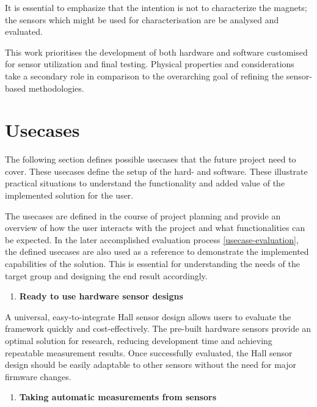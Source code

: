 It is essential to emphasize that the intention is not to characterize
the magnets; the sensors which might be used for characterisation are be
analysed and evaluated.

This work prioritises the development of both hardware and software
customised for sensor utilization and final testing. Physical properties
and considerations take a secondary role in comparison to the
overarching goal of refining the sensor-based methodologies.

\hypertarget{usecases}{%
\section{Usecases}\label{usecases}}

The following section defines possible usecases that the future project
need to cover. These usecases define the setup of the hard- and
software. These illustrate practical situations to understand the
functionality and added value of the implemented solution for the user.

The usecases are defined in the course of project planning and provide
an overview of how the user interacts with the project and what
functionalities can be expected. In the later accomplished evaluation
process \ref{usecase-evaluation}, the defined usecases are also used as
a reference to demonstrate the implemented capabilities of the solution.
This is essential for understanding the needs of the target group and
designing the end result accordingly.

\begin{enumerate}
\def\labelenumi{\arabic{enumi}.}
\tightlist
\item
  \textbf{Ready to use hardware sensor designs}
\end{enumerate}

A universal, easy-to-integrate Hall sensor design allows users to
evaluate the framework quickly and cost-effectively. The pre-built
hardware sensors provide an optimal solution for research, reducing
development time and achieving repeatable measurement results. Once
successfully evaluated, the Hall sensor design should be easily
adaptable to other sensors without the need for major firmware changes.

\begin{enumerate}
\def\labelenumi{\arabic{enumi}.}
\setcounter{enumi}{1}
\tightlist
\item
  \textbf{Taking automatic measurements from sensors}
\end{enumerate}

